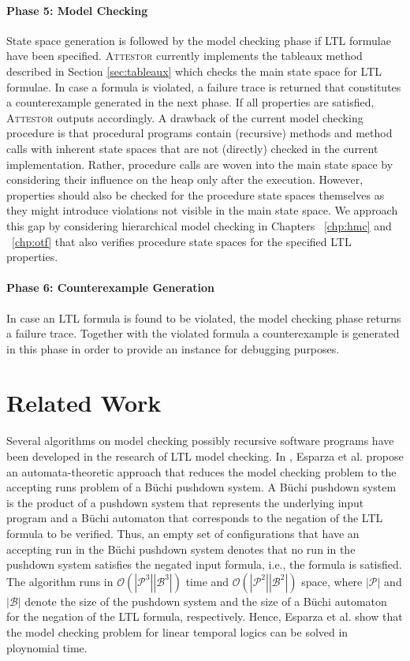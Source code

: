 \documentclass[a4paper, 12pt, twoside]{report}
\begin{document}
	
	\paragraph{Phase 5: Model Checking}
	State space generation is followed by the model checking phase if LTL formulae have been specified. \textsc{Attestor} currently implements the tableaux method described in Section \ref{sec:tableaux} which checks the main state space for LTL formulae. In case a formula is violated, a failure trace is returned that constitutes a counterexample generated in the next phase. If all properties are satisfied, \textsc{Attestor} outputs accordingly. A drawback of the current model checking procedure is that procedural programs contain (recursive) methods and method calls with inherent state spaces that are not (directly) checked in the current implementation. Rather, procedure calls are woven into the main state space by considering their influence on the heap only after the execution. However, properties should also be checked for the procedure state spaces themselves as they might introduce violations not visible in the main state space. We approach this gap by considering hierarchical model checking in Chapters ~\ref{chp:hmc} and ~\ref{chp:otf} that also verifies procedure state spaces for the specified LTL properties.
	
	\paragraph{Phase 6: Counterexample Generation}
	In case an LTL formula is found to be violated, the model checking phase returns a failure trace. Together with the violated formula a counterexample is generated in this phase in order to provide an instance for debugging purposes.

	\section{Related Work}
	Several algorithms on model checking possibly recursive software programs have been developed in the research of LTL model checking. In \cite{esparza2000}, Esparza et al. propose an automata-theoretic approach that reduces the model checking problem to the accepting runs problem of a Büchi pushdown system. A Büchi pushdown system is the product of a pushdown system that represents the underlying input program and a Büchi automaton that corresponds to the negation of the LTL formula to be verified. Thus, an empty set of configurations that have an accepting run in the Büchi pushdown system denotes that no run in the pushdown system satisfies the negated input formula, i.e., the formula is satisfied. The algorithm runs in $\mathcal{O}(|\mathcal{P}^3||\mathcal{B}^3|)$ time and $\mathcal{O}(|\mathcal{P}^2||\mathcal{B}^2|)$ space, where $|\mathcal{P}|$ and $|\mathcal{B}|$ denote the size of the pushdown system and the size of a Büchi automaton for the negation of the LTL formula, respectively. Hence, Esparza et al. show that the model checking problem for linear temporal logics can be solved in ploynomial time.\\
	
\end{document}
